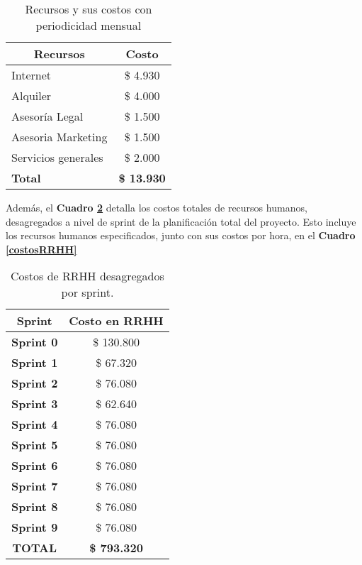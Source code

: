 \begin{table}[h]
\centering
\begin{tabular}{|l|c|}
\hline
\multicolumn{1}{|c|}{{\bf Recursos}} & {\bf Costo}      \\ \hline
Internet                             & \$ 4.930         \\ \hline
Alquiler                             & \$ 4.000         \\ \hline
Asesoría Legal                       & \$ 1.500         \\ \hline
Asesoria Marketing                   & \$ 1.500         \\ \hline
Servicios generales                  & \$ 2.000         \\ \hline
{\bf Total}                          & {\bf \$ 13.930}  \\ \hline
\end{tabular}
\caption{Recursos y sus costos con periodicidad mensual}
\label{recursos_mensuales}
\end{table}

Además, el \textbf{Cuadro \ref{costos-sprint}} detalla los costos totales de recursos humanos, desagregados a nivel de sprint de la planificación total del proyecto.
Esto incluye los recursos humanos especificados, junto con sus costos por hora, en el \textbf{Cuadro \ref{costosRRHH}}

\begin{table}[h]
\centering
\begin{tabular}{|c|c|}
\hline
{\bf Sprint}   & {\bf Costo en RRHH} \\ \hline
{\bf Sprint 0} & \$ 130.800          \\ \hline
{\bf Sprint 1} & \$ 67.320           \\ \hline
{\bf Sprint 2} & \$ 76.080           \\ \hline
{\bf Sprint 3} & \$ 62.640           \\ \hline
{\bf Sprint 4} & \$ 76.080           \\ \hline
{\bf Sprint 5} & \$ 76.080           \\ \hline
{\bf Sprint 6} & \$ 76.080           \\ \hline
{\bf Sprint 7} & \$ 76.080           \\ \hline
{\bf Sprint 8} & \$ 76.080           \\ \hline
{\bf Sprint 9} & \$ 76.080           \\ \hline
{\bf TOTAL}    & {\bf \$ 793.320}    \\ \hline
\end{tabular}
\caption{Costos de RRHH desagregados por sprint.}
\label{costos-sprint}
\end{table}

